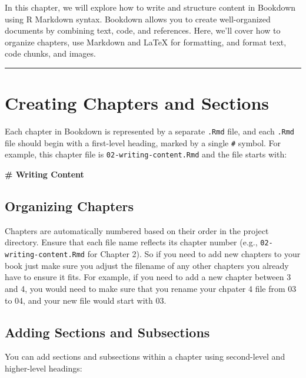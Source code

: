 \documentclass[
]{book}
\newenvironment{Shaded}{\begin{snugshade}}{\end{snugshade}}
\newcommand{\FunctionTok}[1]{\textcolor[rgb]{0.13,0.29,0.53}{\textbf{#1}}}
\theoremstyle{definition}
\theoremstyle{definition}
\theoremstyle{definition}
\theoremstyle{definition}
\theoremstyle{remark}
\begin{document}
In this chapter, we will explore how to write and structure content in Bookdown using R Markdown syntax. Bookdown allows you to create well-organized documents by combining text, code, and references. Here, we'll cover how to organize chapters, use Markdown and LaTeX for formatting, and format text, code chunks, and images.

\begin{center}\rule{0.5\linewidth}{0.5pt}\end{center}

\section{Creating Chapters and Sections}\label{creating-chapters-and-sections}

Each chapter in Bookdown is represented by a separate \texttt{.Rmd} file, and each \texttt{.Rmd} file should begin with a first-level heading, marked by a single \texttt{\#} symbol. For example, this chapter file is \texttt{02-writing-content.Rmd} and the file starts with:

\begin{Shaded}
\begin{Highlighting}[]
\FunctionTok{\# Writing Content}
\end{Highlighting}
\end{Shaded}

\subsection{Organizing Chapters}\label{organizing-chapters}

Chapters are automatically numbered based on their order in the project directory. Ensure that each file name reflects its chapter number (e.g., \texttt{02-writing-content.Rmd} for Chapter 2). So if you need to add new chapters to your book just make sure you adjust the filename of any other chapters you already have to ensure it fits. For example, if you need to add a new chapter between 3 and 4, you would need to make sure that you rename your chpater 4 file from 03 to 04, and your new file would start with 03.

\subsection{Adding Sections and Subsections}\label{adding-sections-and-subsections}

You can add sections and subsections within a chapter using second-level and higher-level headings:
\end{document}
